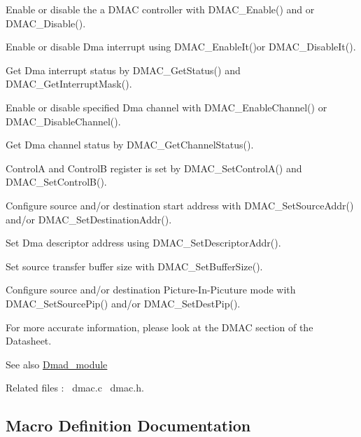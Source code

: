 \begin{DoxyItemize}
\item Enable or disable the a D\+M\+AC controller with D\+M\+A\+C\+\_\+\+Enable() and or D\+M\+A\+C\+\_\+\+Disable(). 
\item Enable or disable Dma interrupt using D\+M\+A\+C\+\_\+\+Enable\+It()or D\+M\+A\+C\+\_\+\+Disable\+It(). 
\item Get Dma interrupt status by D\+M\+A\+C\+\_\+\+Get\+Status() and D\+M\+A\+C\+\_\+\+Get\+Interrupt\+Mask(). 
\item Enable or disable specified Dma channel with D\+M\+A\+C\+\_\+\+Enable\+Channel() or D\+M\+A\+C\+\_\+\+Disable\+Channel(). 
\item Get Dma channel status by D\+M\+A\+C\+\_\+\+Get\+Channel\+Status(). 
\item ControlA and ControlB register is set by D\+M\+A\+C\+\_\+\+Set\+Control\+A() and D\+M\+A\+C\+\_\+\+Set\+Control\+B(). 
\item Configure source and/or destination start address with D\+M\+A\+C\+\_\+\+Set\+Source\+Addr() and/or D\+M\+A\+C\+\_\+\+Set\+Destination\+Addr(). 
\item Set Dma descriptor address using D\+M\+A\+C\+\_\+\+Set\+Descriptor\+Addr(). 
\item Set source transfer buffer size with D\+M\+A\+C\+\_\+\+Set\+Buffer\+Size(). 
\item Configure source and/or destination Picture-\/\+In-\/\+Picuture mode with D\+M\+A\+C\+\_\+\+Set\+Source\+Pip() and/or D\+M\+A\+C\+\_\+\+Set\+Dest\+Pip(). 
\end{DoxyItemize}

For more accurate information, please look at the D\+M\+AC section of the Datasheet.

\begin{DoxySeeAlso}{See also}
\mbox{\hyperlink{group__dmad__module}{Dmad\+\_\+module}}
\end{DoxySeeAlso}
Related files \+:~\newline
dmac.\+c~\newline
 dmac.\+h.~\newline
 

\subsection{Macro Definition Documentation}
\mbox{\label{group__dmac__module_ga19026388462c97bc69c5943072b990d4}} 
